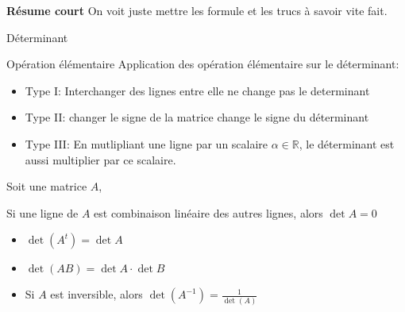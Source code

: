 \textbf{Résume court}
On voit juste mettre les formule et les trucs à savoir vite fait.\\
\begin{parag}{Déterminant}
    \begin{subparag}{Opération élémentaire}
        Application des opération élémentaire sur le déterminant:
        \begin{itemize}
            \item Type I: Interchanger des lignes entre elle ne change pas le determinant
            \item Type II: changer le signe de la matrice change le signe du déterminant
            \item Type III: En mutlipliant une ligne par un scalaire $\alpha \in \mathbb{R}$, le déterminant est aussi multiplier par ce scalaire.
        \end{itemize}
    \end{subparag}
    Soit une matrice $A$, 
    \begin{truc}
        Si une ligne de $A$ est combinaison linéaire des autres lignes, alors $\det A = 0$
    \end{truc}
    \begin{theoreme}
        \begin{itemize}
            \item $\det (A^t) = \det A$
            \item $\det(AB) = \det A \cdot \det B$
            \item Si $A$ est inversible, alors $\det(A^{-1}) = \frac{1}{\det(A)}$
        \end{itemize}
    \end{theoreme}
    
\end{parag}
